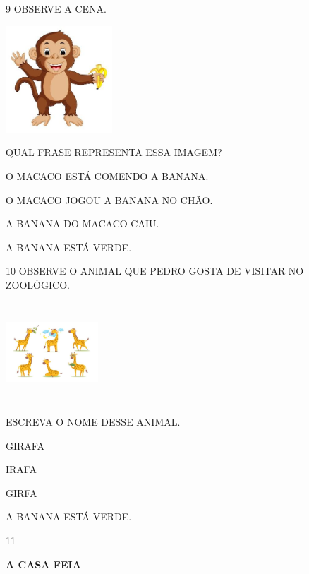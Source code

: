\num{9} OBSERVE A CENA.

\includegraphics[width=1.57569in,height=1.57569in]{media/image218.jpg}

QUAL FRASE REPRESENTA ESSA IMAGEM?

\begin{escolha}
\item O MACACO ESTÁ COMENDO A BANANA.

\item O MACACO JOGOU A BANANA NO CHÃO.

\item A BANANA DO MACACO CAIU.

\item A BANANA ESTÁ VERDE.
\end{escolha}

\num{10} OBSERVE O ANIMAL QUE PEDRO GOSTA DE VISITAR NO ZOOLÓGICO.

\includegraphics[width=1.36806in,height=1.47778in]{media/image219.jpg}

ESCREVA O NOME DESSE ANIMAL.

\begin{escolha}
\item GIRAFA

\item IRAFA

\item GIRFA

\item A BANANA ESTÁ VERDE.
\end{escolha}

\num{11}

\textbf{A CASA FEIA}

